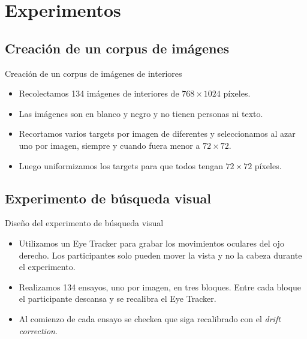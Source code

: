 \documentclass[compress]{beamer}
\begin{document}
\section{Experimentos}
\subsection{Creación de un corpus de imágenes}
\begin{frame}{Creación de un corpus de imágenes de interiores}
\begin{itemize}
\item Recolectamos 134 imágenes de interiores de $768 \times 1024$ píxeles.
\item Las imágenes son en blanco y negro y no tienen personas ni texto.
\item Recortamos varios targets por imagen de diferentes y seleccionamos al azar uno por imagen, siempre y cuando fuera menor a $72 \times 72$.
\item Luego uniformizamos los targets para que todos tengan $72 \times 72$ píxeles.
\end{itemize}
\end{frame}

\subsection{Experimento de búsqueda visual}
\begin{frame}{Diseño del experimento de búsqueda visual}

\begin{itemize}
\item Utilizamos un Eye Tracker para grabar los movimientos oculares del ojo derecho. Los participantes solo pueden mover la vista y no la cabeza durante el experimento.
\item Realizamos 134 ensayos, uno por imagen, en tres bloques. Entre cada bloque el participante descansa y se recalibra el Eye Tracker.
\item Al comienzo de cada ensayo se checkea que siga recalibrado con el \textit{drift correction}.
\end{itemize}

\end{frame}
\end{document}
